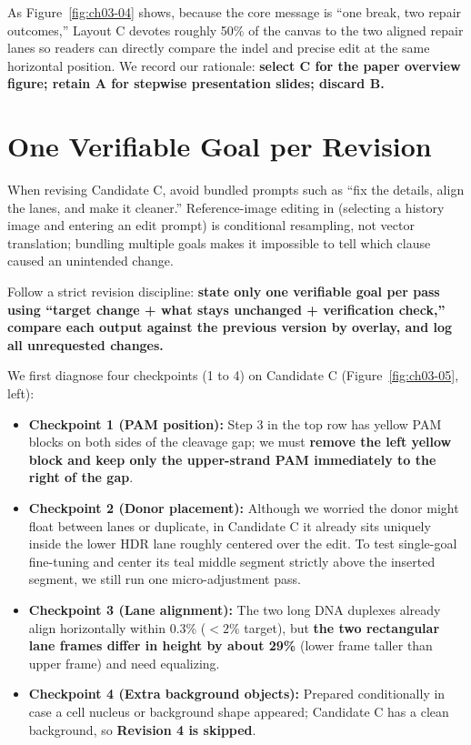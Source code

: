 As Figure~\ref{fig:ch03-04} shows, because the core message is ``one break, two repair outcomes,'' Layout C devotes roughly 50\% of the canvas to the two aligned repair lanes so readers can directly compare the indel and precise edit at the same horizontal position. We record our rationale: \textbf{select C for the paper overview figure; retain A for stepwise presentation slides; discard B.}

\section{One Verifiable Goal per Revision}

When revising Candidate C, avoid bundled prompts such as ``fix the details, align the lanes, and make it cleaner.'' Reference-image editing in \scidraw{} (selecting a history image and entering an edit prompt) is conditional resampling, not vector translation; bundling multiple goals makes it impossible to tell which clause caused an unintended change.

Follow a strict revision discipline: \textbf{state only one verifiable goal per pass using ``target change + what stays unchanged + verification check,'' compare each output against the previous version by overlay, and log all unrequested changes.}

We first diagnose four checkpoints (1 to 4) on Candidate C (Figure~\ref{fig:ch03-05}, left):

\begin{itemize}
\item \textbf{Checkpoint 1 (PAM position):} Step 3 in the top row has yellow PAM blocks on both sides of the cleavage gap; we must \textbf{remove the left yellow block and keep only the upper-strand PAM immediately to the right of the gap}.
\item \textbf{Checkpoint 2 (Donor placement):} Although we worried the donor might float between lanes or duplicate, in Candidate C it already sits uniquely inside the lower HDR lane roughly centered over the edit. To test single-goal fine-tuning and center its teal middle segment strictly above the inserted segment, we still run one micro-adjustment pass.
\item \textbf{Checkpoint 3 (Lane alignment):} The two long DNA duplexes already align horizontally within 0.3\% ($<2\%$ target), but \textbf{the two rectangular lane frames differ in height by about 29\%} (lower frame taller than upper frame) and need equalizing.
\item \textbf{Checkpoint 4 (Extra background objects):} Prepared conditionally in case a cell nucleus or background shape appeared; Candidate C has a clean background, so \textbf{Revision 4 is skipped}.
\end{itemize}


